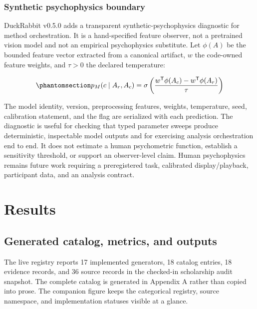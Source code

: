\documentclass[
  english,
]{article}
\begin{document}
\subsubsection{Synthetic psychophysics
boundary}\label{synthetic-psychophysics-boundary}

DuckRabbit v0.5.0 adds a transparent synthetic-psychophysics diagnostic
for method orchestration. It is a hand-specified feature observer, not a
pretrained vision model and not an empirical psychophysics substitute.
Let \(\phi(A)\) be the bounded feature vector extracted from a canonical
artifact, \(w\) the code-owned feature weights, and \(\tau>0\) the
declared temperature:

\begin{equation}\protect\phantomsection\label{eq:synthetic_observer}{
p_M(c\mid A_r,A_c) =
\sigma\left(\frac{w^\mathsf{T}\phi(A_c)-w^\mathsf{T}\phi(A_r)}{\tau}\right)
}\end{equation}

The model identity, version, preprocessing features, weights,
temperature, seed, calibration statement, and the
 flag are serialized with each prediction. The
diagnostic is useful for checking that typed parameter sweeps produce
deterministic, inspectable model outputs and for exercising analysis
orchestration end to end. It does not estimate a human psychometric
function, establish a sensitivity threshold, or support an
observer-level claim. Human psychophysics remains future work requiring
a preregistered task, calibrated display/playback, participant data, and
an analysis contract.

\newpage

\section{Results}\label{sec:results}

\subsection{Generated catalog, metrics, and
outputs}\label{generated-catalog-metrics-and-outputs}

The live registry reports 17 implemented generators, 18 catalog entries,
18 evidence records, and 36 source records in the checked-in scholarship
audit snapshot. The complete catalog is generated in Appendix A rather
than copied into prose. The companion figure keeps the categorical
registry, source namespace, and implementation statuses visible at a
glance.
\end{document}
